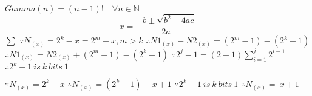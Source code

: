 $Gamma(n)=(n-1)!\quad\forall n\in\mathbb N$
$$ x= \dfrac{-b \pm \sqrt{b^2 - 4ac}}{2a} $$
$ \sum $
$ \because N_{(x)}= 2^k-x = 2^m-x , m>k$
$\therefore N1_{(x)} - N2_{(x)}=(2^m-1)-(2^k-1)$
$ \therefore N1_{(x)} = N2_{(x)}+(2^m-1)-(2^k-1)$
$ \because 2^j-1=(2-1)\sum_{i=1}^j2^{i-1} $
$ \therefore 2^k-1\ is\ k\ bits\ 1\ $

$\because N_{(x)} = 2^k-x$
$\therefore N_{(x)}=(2^k-1)-x+1$
$\because 2^k-1\ is\ k\ bits\ 1$
$\therefore N_{(x)}=~x+1$